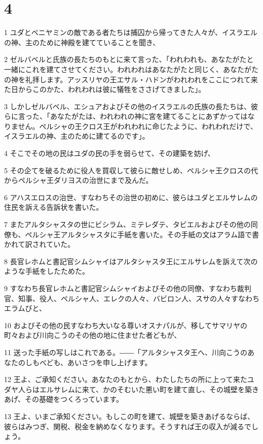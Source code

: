 \chapter{4}

\par 1 ユダとベニヤミンの敵である者たちは捕囚から帰ってきた人々が、イスラエルの神、主のために神殿を建てていることを聞き、
\par 2 ゼルバベルと氏族の長たちのもとに来て言った、「われわれも、あなたがたと一緒にこれを建てさせてください。われわれはあなたがたと同じく、あなたがたの神を礼拝します。アッスリヤの王エサル・ハドンがわれわれをここにつれて来た日からこのかた、われわれは彼に犠牲をささげてきました」。
\par 3 しかしゼルバベル、エシュアおよびその他のイスラエルの氏族の長たちは、彼らに言った、「あなたがたは、われわれの神に宮を建てることにあずかってはなりません。ペルシャの王クロス王がわれわれに命じたように、われわれだけで、イスラエルの神、主のために建てるのです」。
\par 4 そこでその地の民はユダの民の手を弱らせて、その建築を妨げ、
\par 5 その企てを破るために役人を買収して彼らに敵せしめ、ペルシャ王クロスの代からペルシャ王ダリヨスの治世にまで及んだ。
\par 6 アハスエロスの治世、すなわちその治世の初めに、彼らはユダとエルサレムの住民を訴える告訴状を書いた。
\par 7 またアルタシャスタの世にビシラム、ミテレダテ、タビエルおよびその他の同僚も、ペルシャ王アルタシャスタに手紙を書いた。その手紙の文はアラム語で書かれて訳されていた。
\par 8 長官レホムと書記官シムシャイはアルタシャスタ王にエルサレムを訴えて次のような手紙をしたためた。
\par 9 すなわち長官レホムと書記官シムシャイおよびその他の同僚、すなわち裁判官、知事、役人、ペルシャ人、エレクの人々、バビロン人、スサの人々すなわちエラムびと、
\par 10 およびその他の民すなわち大いなる尊いオスナパルが、移してサマリヤの町々および川向こうのその他の地に住ませた者どもが、
\par 11 送った手紙の写しはこれである。――「アルタシャスタ王へ、川向こうのあなたのしもべども、あいさつを申し上げます。
\par 12 王よ、ご承知ください。あなたのもとから、わたしたちの所に上って来たユダヤ人らはエルサレムに来て、かのそむいた悪い町を建て直し、その城壁を築きあげ、その基礎をつくろっています。
\par 13 王よ、いまご承知ください。もしこの町を建て、城壁を築きあげるならば、彼らはみつぎ、関税、税金を納めなくなります。そうすれば王の収入が減るでしょう。
